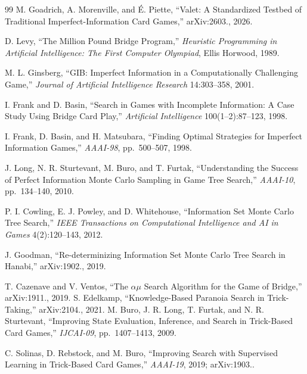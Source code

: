 \begin{thebibliography}{99}
M. Goadrich, A. Morenville, and \'E. Piette, ``Valet: A Standardized Testbed of
Traditional Imperfect-Information Card Games,'' arXiv:2603., 2026.

D. Levy, ``The Million Pound Bridge Program,'' \emph{Heuristic Programming in
Artificial Intelligence: The First Computer Olympiad}, Ellis Horwood, 1989.

M. L. Ginsberg, ``GIB: Imperfect Information in a Computationally Challenging
Game,'' \emph{Journal of Artificial Intelligence Research} 14:303--358, 2001.

I. Frank and D. Basin, ``Search in Games with Incomplete Information: A Case
Study Using Bridge Card Play,'' \emph{Artificial Intelligence}
100(1--2):87--123, 1998.

I. Frank, D. Basin, and H. Matsubara, ``Finding Optimal Strategies for Imperfect
Information Games,'' \emph{AAAI-98}, pp.~500--507, 1998.

J. Long, N. R. Sturtevant, M. Buro, and T. Furtak, ``Understanding the Success
of Perfect Information Monte Carlo Sampling in Game Tree Search,''
\emph{AAAI-10}, pp.~134--140, 2010.

P. I. Cowling, E. J. Powley, and D. Whitehouse, ``Information Set Monte Carlo
Tree Search,'' \emph{IEEE Transactions on Computational Intelligence and AI in
Games} 4(2):120--143, 2012.

J. Goodman, ``Re-determinizing Information Set Monte Carlo Tree Search in
Hanabi,'' arXiv:1902., 2019.

T. Cazenave and V. Ventos, ``The $\alpha\mu$ Search Algorithm for the Game of
Bridge,'' arXiv:1911., 2019.
S. Edelkamp, ``Knowledge-Based Paranoia Search in Trick-Taking,''
arXiv:2104., 2021.
M. Buro, J. R. Long, T. Furtak, and N. R. Sturtevant, ``Improving State
Evaluation, Inference, and Search in Trick-Based Card Games,'' \emph{IJCAI-09},
pp.~1407--1413, 2009.

C. Solinas, D. Rebstock, and M. Buro, ``Improving Search with Supervised
Learning in Trick-Based Card Games,'' \emph{AAAI-19}, 2019; arXiv:1903..


\end{thebibliography}
